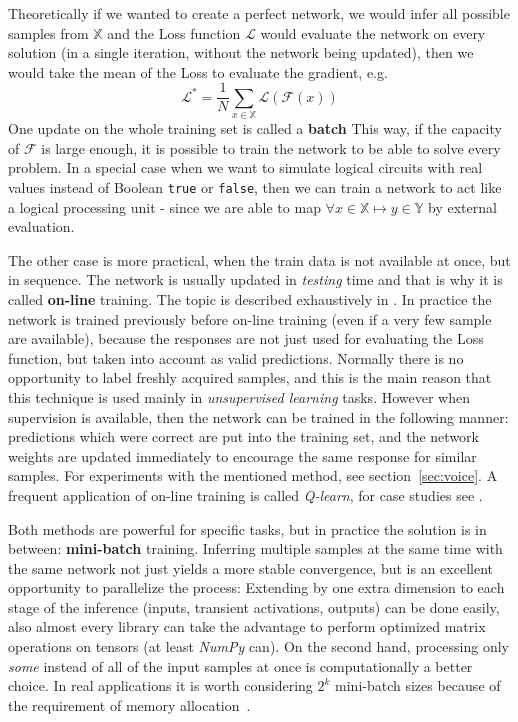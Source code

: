 Theoretically if we wanted to create a perfect network, we would infer all possible samples from $\mathbb{X}$ and the Loss function 
$\mathcal{L}$ would evaluate the network on every solution (in a single iteration, without the network being updated), 
then we would take the mean of the Loss to evaluate the gradient, e.g. 
$$\mathcal{L}^*=\frac{1}{N}\sum_{x \in \mathbb{X}}\mathcal{L}(\mathcal{F}(x))$$
One update on the whole training set is called a \textbf{batch}
This way, if the capacity of $\mathcal{F}$ is large enough, it is possible to train the network to be able to solve every problem.
In a special case when we want to simulate logical circuits with real values instead of Boolean \texttt{true} or \texttt{false},
then we can train a network to act like a logical processing unit - since we are able to map $\forall x \in \mathbb{X} \mapsto y \in \mathbb{Y}$ by 
external evaluation.

The other case is more practical, when the train data is not available at once, but in sequence.
The network is usually updated in \emph{testing} time and that is why it is called \textbf{on-line} training.
The topic is described exhaustively in \cite{onlinelearn}.
In practice the network is trained previously before on-line training (even if a very few sample are available), 
because the responses are not just used for evaluating the Loss function, but taken into account as valid predictions.
Normally there is no opportunity to label freshly acquired samples, 
and this is the main reason that this technique is used mainly in \emph{unsupervised learning} tasks.
However when supervision is available, then the network can be trained in the following manner:
predictions which were correct are put into the training set, 
and the network weights are updated immediately 
to encourage the same response for similar samples.
For experiments with the mentioned method, see section~\ref{sec:voice}.
A frequent application of on-line training is called \emph{Q-learn}, for case studies see \cite{qlearn-case}.

Both methods are powerful for specific tasks, but in practice the solution is in between: \textbf{mini-batch} training.
Inferring multiple samples at the same time with the same network not just yields a more stable convergence, 
but is an excellent opportunity to parallelize the process:
Extending by one extra dimension to each stage of the inference (inputs, transient activations, outputs) can be done easily,
also almost every library can take the advantage to perform optimized matrix operations on tensors (at least \emph{NumPy} can).
On the second hand, processing only \emph{some} instead of all of the input samples at once is computationally a better choice.
In real applications it is worth considering $2^k$ mini-batch sizes because of the requirement of memory allocation~\cite{stanfordlectures}.

